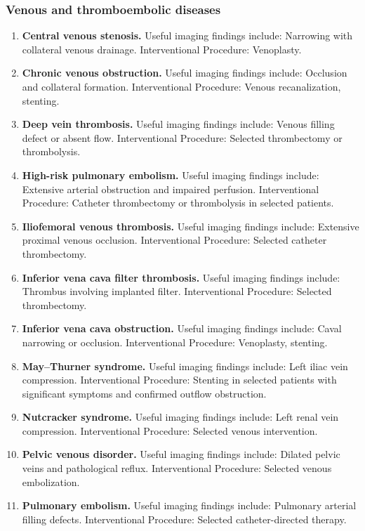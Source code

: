 \subsubsection{Venous and thromboembolic diseases}
\begin{enumerate}[leftmargin=*,itemsep=0.45em,topsep=0.4em]
\item \textbf{Central venous stenosis.} Useful imaging findings include: Narrowing with collateral venous drainage. Interventional Procedure: Venoplasty.
\item \textbf{Chronic venous obstruction.} Useful imaging findings include: Occlusion and collateral formation. Interventional Procedure: Venous recanalization, stenting.
\item \textbf{Deep vein thrombosis.} Useful imaging findings include: Venous filling defect or absent flow. Interventional Procedure: Selected thrombectomy or thrombolysis.
\item \textbf{High-risk pulmonary embolism.} Useful imaging findings include: Extensive arterial obstruction and impaired perfusion. Interventional Procedure: Catheter thrombectomy or thrombolysis in selected patients.
\item \textbf{Iliofemoral venous thrombosis.} Useful imaging findings include: Extensive proximal venous occlusion. Interventional Procedure: Selected catheter thrombectomy.
\item \textbf{Inferior vena cava filter thrombosis.} Useful imaging findings include: Thrombus involving implanted filter. Interventional Procedure: Selected thrombectomy.
\item \textbf{Inferior vena cava obstruction.} Useful imaging findings include: Caval narrowing or occlusion. Interventional Procedure: Venoplasty, stenting.
\item \textbf{May--Thurner syndrome.} Useful imaging findings include: Left iliac vein compression. Interventional Procedure: Stenting in selected patients with significant symptoms and confirmed outflow obstruction.
\item \textbf{Nutcracker syndrome.} Useful imaging findings include: Left renal vein compression. Interventional Procedure: Selected venous intervention.
\item \textbf{Pelvic venous disorder.} Useful imaging findings include: Dilated pelvic veins and pathological reflux. Interventional Procedure: Selected venous embolization.
\item \textbf{Pulmonary embolism.} Useful imaging findings include: Pulmonary arterial filling defects. Interventional Procedure: Selected catheter-directed therapy.

\end{enumerate}
